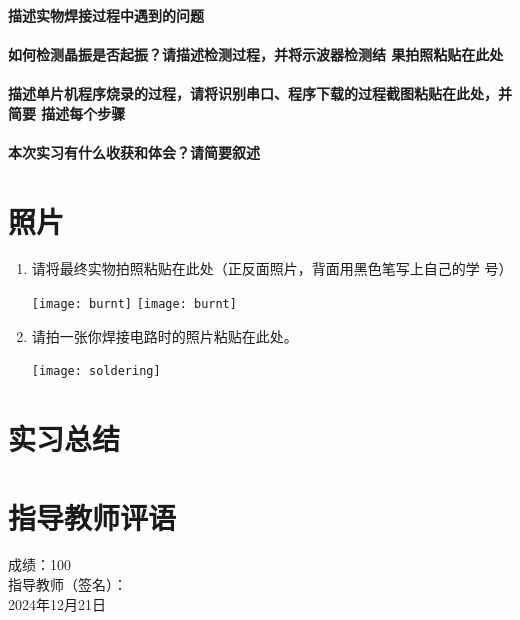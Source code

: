 \documentclass{swfulabreport}
\begin{document}
\paragraph{描述实物焊接过程中遇到的问题}

\zhlipsum[3-4]

\paragraph{如何检测晶振是否起振？请描述检测过程，并将示波器检测结
  果拍照粘贴在此处}

\zhlipsum[5-6]

\paragraph{描述单片机程序烧录的过程，请将识别串口、程序下载的过程截图粘贴在此处，并简要
描述每个步骤}

\zhlipsum[7-8]

\paragraph{本次实习有什么收获和体会？请简要叙述}

\zhlipsum[9-10]



\section{照片}

\begin{enumerate}
\item 请将最终实物拍照粘贴在此处（正反面照片，背面用黑色笔写上自己的学
  号）

  \begin{center}
    \texttt{[image: burnt]}\qquad
    \texttt{[image: burnt]}
  \end{center}

\item 请拍一张你焊接电路时的照片粘贴在此处。

  \begin{center}
    \texttt{[image: soldering]}
  \end{center}

\end{enumerate}

\section{实习总结}

\zhlipsum[7-9]

\section{指导教师评语}

\zhlipsum[10]

\begin{flushright}
  成绩：100\\
  指导教师（签名）：\\
  2024年12月21日
\end{flushright}
\end{document}
